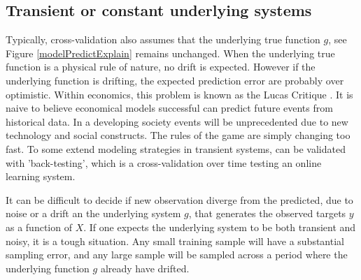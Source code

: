 \subsection{Transient or constant underlying systems}
Typically, cross-validation also assumes that the underlying true function $g$, see Figure \ref{modelPredictExplain} remains unchanged. When the underlying true function is a physical rule of nature, no drift is expected. However if the underlying function is drifting, the expected prediction error are probably over optimistic. Within economics, this problem is known as the Lucas Critique \cite{wiki:Lucus}. It is naive to believe economical models successful can predict future events from historical data. In a developing society events will be unprecedented due to new technology and social constructs. The rules of the game are simply changing too fast. To some extend modeling strategies in transient systems, can be validated with 'back-testing', which is a cross-validation over time testing an online learning system.

It can be difficult to decide if new observation diverge from the predicted, due to noise or  a drift an the underlying system $g$, that generates the observed targets $y$ as a function of $X$. If one expects the underlying system to be both transient and noisy, it is a tough situation. Any small training sample will have a substantial sampling error, and any large sample will be sampled across a period where the underlying function $g$ already have drifted.

